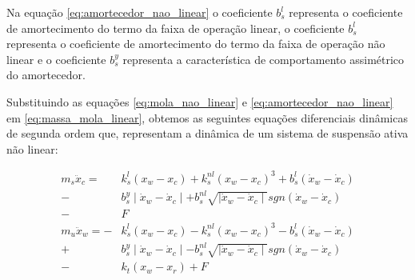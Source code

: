 Na equação \ref{eq:amortecedor_nao_linear} o coeficiente $b^{l}_{s}$ representa o coeficiente de amortecimento do termo da faixa de operação linear, o coeficiente $b^{l}_{s}$ representa o coeficiente de amortecimento do termo da faixa de operação não linear e o coeficiente $b^{y}_{s}$ representa a característica de comportamento assimétrico do amortecedor.
    
Substituindo as equações \ref{eq:mola_nao_linear} e \ref{eq:amortecedor_nao_linear} em \ref{eq:massa_mola_linear}, obtemos as seguintes equações diferenciais dinâmicas de segunda ordem que, representam a dinâmica de um sistema de suspensão ativa não linear:
    
\begin{equation} \label{eq:massa_mola_nao_linear}
    \begin{aligned}
         m_{s} \ddot{x}_{c} =\ \ &k^{l}_{s}(x_{w}-x_{c})+k^{nl}_{s}(x_{w}-x_{c})^{3}+b^{l}_{s}(\dot{x}_{w}-\dot{x}_{c})\\
                            -&b^{y}_{s}\mid\dot{x}_{w}-\dot{x}_{c}\mid+b^{nl}_{s}\sqrt{\mid\dot{x}_{w}-\dot{x}_{c}\mid}sgn(\dot{x}_{w}-\dot{x}_{c})\\ 
                            -&F\\
         m_{u} \ddot{x}_{w} = -&k^{l}_{s}(x_{w}-x_{c})-k^{nl}_{s}(x_{w}-x_{c})^{3}-b^{l}_{s}(\dot{x}_{w}-\dot{x}_{c})\\  
                            +&b^{y}_{s}\mid\dot{x}_{w}-\dot{x}_{c}\mid-b^{nl}_{s}\sqrt{\mid\dot{x}_{w}-\dot{x}_{c}\mid}sgn(\dot{x}_{w}-\dot{x}_{c})\\
                            -&k_{t}(x_{w}-x_{r})+F\\
    \end{aligned}
\end{equation}
        
